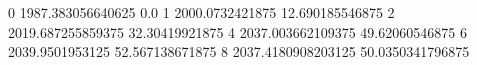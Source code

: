 0 1987.383056640625 0.0
1 2000.0732421875 12.690185546875
2 2019.687255859375 32.30419921875
4 2037.003662109375 49.62060546875
6 2039.9501953125 52.567138671875
8 2037.4180908203125 50.0350341796875
